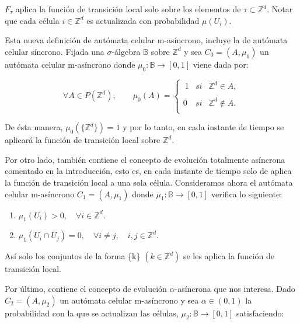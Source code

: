 \documentclass[../proyecto.tex]{memoir}
\begin{document}
$F_{\tau}$ aplica la función de transición local solo sobre los elementos de $\tau \subset \mathds{Z}^{d}$. Notar que cada célula $i \in \mathds{Z}^{d}$ es actualizada con probabilidad $\mu(U_{i})$.

Esta nueva definición de autómata celular m-asíncrono, incluye la de autómata celular síncrono. Fijada una $\sigma$-álgebra $\mathds{B}$ sobre $\mathds{Z}^{d}$ y sea $C_{0}=(A, \mu_{0})$ un autómata celular m-asíncrono donde $\mu_{0}: \mathds{B} \rightarrow [0,1]$ viene dada por: 

\begin{equation*}
	 \forall A \in P(\mathds{Z}^{d}), \qquad 
	 \mu_{0}(A) = \left\{ \begin{array}{lcc}
             \ 1 &   si  & \mathds{Z}^{d} \in A ,\\
             \\0 &   si  & \mathds{Z}^{d} \notin A .\\
             \end{array}
             \right.
\end{equation*}

De ésta manera, $\mu_{0}(\{\mathds{Z}^{d}\})=1$ y por lo tanto, en cada instante de tiempo se aplicará la función de transición local sobre $\mathds{Z}^{d}$.

Por otro lado, también contiene el concepto de evolución totalmente asíncrona comentado en la introducción, esto es, en cada instante de tiempo solo de aplica la función de transición local a una sola célula. Consideramos ahora el autómata celular m-asíncrono $C_{1}=(A, \mu_{1})$ donde $\mu_{1}: \mathds{B} \rightarrow [0,1]$ verifica lo siguiente:

\begin{enumerate}
\item $\mu_{1}(U_{i}) > 0, \quad \forall i \in \mathds{Z}^{d}$.
\item $\mu_{1}(U_{i} \cap U_{j}) = 0, \quad \forall i \neq j, \quad i,j \in \mathds{Z}^{d}$.
\end{enumerate}

Así solo los conjuntos de la forma \{k\} $(k \in \mathds{Z}^{d})$ se les aplica la función de transición local.

Por último, contiene el concepto de evolución $\alpha$-asíncrona que nos interesa. Dado $C_{2}=(A, \mu_{2})$ un autómata celular m-asíncrono y sea $\alpha \in (0,1)$ la probabilidad con la que se actualizan las células, $\mu_{2}: \mathds{B} \rightarrow [0,1]$ satisfaciendo:
\end{document}
